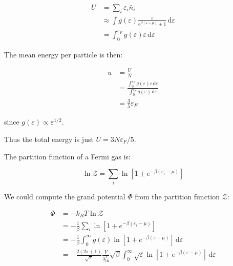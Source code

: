 \documentclass[12pt]{article}
\begin{document}
\begin{equation}
    \begin{split}
        U &= \sum_{i} \varepsilon_{i} \bar{n}_{i} \\
        &\approx \int g(\varepsilon) \frac{\varepsilon}{e^{\beta (\varepsilon - \mu)} + 1} \, \mathrm{d}\varepsilon \\
        &= \int_{0}^{\varepsilon_{F}} g(\varepsilon) \varepsilon \, \mathrm{d}\varepsilon
    \end{split}
\end{equation}

The mean energy per particle is then:

\begin{equation}
    \begin{split}
        u &= \frac{U}{N} \\
        &= \frac{\int_{0}^{\varepsilon_{F}} g(\varepsilon) \varepsilon \, \mathrm{d}\varepsilon}{\int_{0}^{\varepsilon_{F}} g(\varepsilon) \, \mathrm{d}\varepsilon} \\
        &= \frac{3}{5} \varepsilon_{F}
    \end{split}
\end{equation}

since $g(\varepsilon) \propto \varepsilon^{1/2}$.

Thus the total energy is just $U = 3N \varepsilon_{F}/5$.

The partition function of a Fermi gas is:

\begin{equation}
    \ln{\mathcal{Z}} = \sum_{i} \ln{\left[ 1 \pm e^{-\beta (\varepsilon_{i} - \mu)} \right]}
\end{equation}



We could compute the grand potential $\Phi$ from the partition function $\mathcal{Z}$:

\begin{equation}
    \begin{split}
        \Phi &= -k_{B}T \ln{\mathcal{Z}} \\
        &= -\frac{1}{\beta} \sum_{i} \ln{\left[ 1 + e^{-\beta (\varepsilon_{i} - \mu)} \right]} \\
        &= -\frac{1}{\beta} \int_{0}^{\infty} g(\varepsilon) \ln{\left[ 1 + e^{-\beta (\varepsilon - \mu)} \right]} \, \mathrm{d}\varepsilon \\
        &= -\frac{2(2s+1)}{\sqrt{\pi}} \frac{V}{\lambda_{\text{th}}^3} \sqrt{\beta} \int_{0}^{\infty} \sqrt{\varepsilon} \ln{\left[ 1 + e^{-\beta (\varepsilon - \mu)} \right]} \, \mathrm{d}\varepsilon
    \end{split}
\end{equation}
\end{document}
